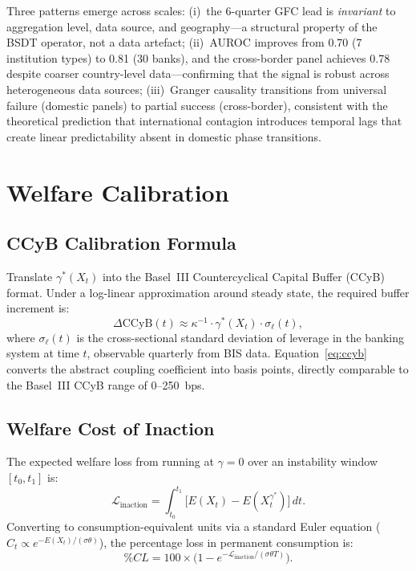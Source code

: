\documentclass[11pt]{article}
\theoremstyle{definition}
\begin{document}
\noindent Three patterns emerge across scales:
(i)~the 6-quarter GFC lead is \emph{invariant} to aggregation level, data
source, and geography---a structural property of the BSDT operator, not
a data artefact;
(ii)~AUROC improves from 0.70 (7 institution types) to 0.81 (30 banks),
and the cross-border panel achieves 0.78 despite coarser country-level
data---confirming that the signal is robust across heterogeneous data
sources;
(iii)~Granger causality transitions from universal failure (domestic panels)
to partial success (cross-border), consistent with the theoretical prediction
that international contagion introduces temporal lags that create linear
predictability absent in domestic phase transitions.

\section{Welfare Calibration}
\label{sec:welfare}

\subsection{CCyB Calibration Formula}

Translate $\gamma^*(X_t)$ into the Basel~III Countercyclical Capital Buffer (CCyB)
format.  Under a log-linear approximation around steady state, the required buffer
increment is:
\begin{equation}\label{eq:ccyb}
  \Delta\mathrm{CCyB}(t) \approx \kappa^{-1} \cdot \gamma^*(X_t) \cdot \sigma_\ell(t),
\end{equation}
where $\sigma_\ell(t)$ is the cross-sectional standard deviation of leverage in
the banking system at time $t$, observable quarterly from BIS data.
Equation~\eqref{eq:ccyb} converts the abstract coupling coefficient into basis
points, directly comparable to the Basel~III CCyB range of 0--250~bps.

\subsection{Welfare Cost of Inaction}

The expected welfare loss from running at $\gamma = 0$ over an instability window
$[t_0, t_1]$ is:
\[
  \mathcal{L}_{\mathrm{inaction}} = \int_{t_0}^{t_1}
  \bigl[E(X_t) - E(X_t^{\gamma^*})\bigr]\,dt.
\]
Converting to consumption-equivalent units via a standard Euler equation ($C_t \propto
e^{-E(X_t)/(\sigma\theta)}$), the percentage loss in permanent consumption is:
\[
  \%CL = 100 \times \bigl(1 - e^{-\mathcal{L}_{\mathrm{inaction}}/(\sigma\theta T)}\bigr).
\]
\end{document}
